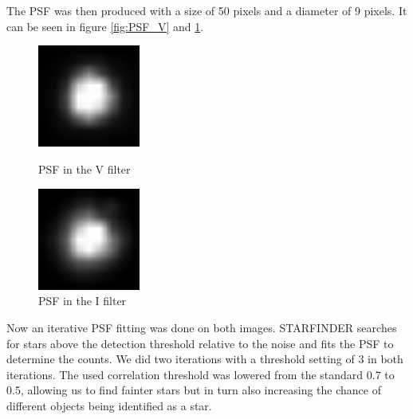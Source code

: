 \documentclass[12pt]{article}
\begin{document}
The PSF was then produced with a size of 50 pixels and a diameter of 9 pixels. It can be seen in figure \ref{fig:PSF_V} and \ref{fig:PSF_I}. 
\begin{figure}[h]
  \centering
  \parbox{80mm}{
    \centering
    \includegraphics[width=0.3\textwidth]{figures/PSF_V_n.png}
    \caption{PSF in the V filter}
    \label{fig:PSF_V}
  }
  \parbox{80mm}{
    \centering
    \includegraphics[width=0.3\textwidth]{figures/PSF_I_n.png}
    \caption{PSF in the I filter}
    \label{fig:PSF_I}
  }
  
\end{figure}
Now an iterative PSF fitting was done on both images. STARFINDER searches for stars above the detection threshold relative to the noise and fits the PSF to determine the counts. We did two iterations with a threshold setting of 3 in both iterations.  The used correlation threshold was lowered from the standard 0.7 to 0.5, allowing us to find fainter stars but in turn also increasing the chance of different objects being identified as a star.
\end{document}
